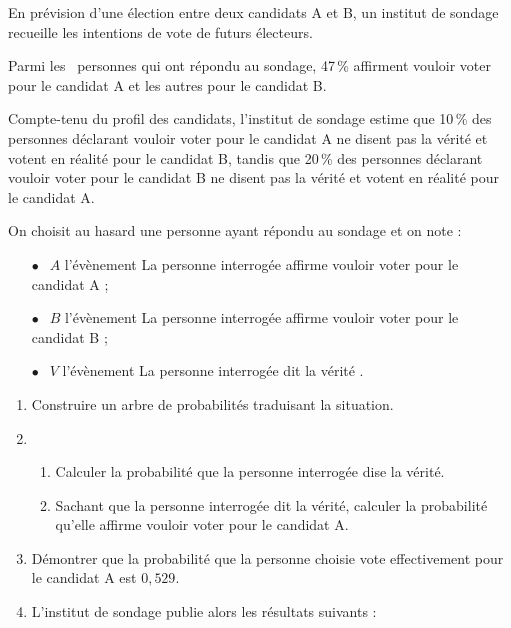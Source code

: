\documentclass[12pt,frenchb]{article}
\begin{document}
\begin{question}[subtitle={Liban 2015}]
En prévision d'une élection entre deux candidats A et B, un institut de sondage recueille les
intentions de vote de futurs électeurs.

Parmi les ~personnes qui ont répondu au sondage, 47\,\% affirment vouloir voter pour le
candidat A et les autres pour le candidat B.

\medskip

Compte-tenu du profil des candidats, l'institut de sondage estime que 10\,\% des personnes
déclarant vouloir voter pour le candidat A ne disent pas la vérité et votent en réalité pour
le candidat B, tandis que 20\,\% des personnes déclarant vouloir voter pour le candidat B ne
disent pas la vérité et votent en réalité pour le candidat A.

\medskip

On choisit au hasard une personne ayant répondu au sondage et on note :

\setlength\parindent{6mm}
\begin{itemize}
\item[$\bullet~~$] $A$ l'évènement \og La personne interrogée affirme vouloir voter pour le candidat A \fg{} ;
\item[$\bullet~~$] $B$ l'évènement \og La personne interrogée affirme vouloir voter pour le candidat B \fg{} ;
\item[$\bullet~~$] $V$ l'évènement \og La personne interrogée dit la vérité \fg.
\end{itemize}
\setlength\parindent{0mm}

\medskip

\begin{enumerate}
\item Construire un arbre de probabilités traduisant la
  situation.
\item  
	\begin{enumerate}
		\item Calculer la probabilité que la personne interrogée dise la vérité.
		\item Sachant que la personne interrogée dit la vérité, calculer la probabilité qu'elle
affirme vouloir voter pour le candidat A.
	\end{enumerate}
\item  Démontrer que la probabilité que la personne choisie vote effectivement pour le candidat
A est $0,529$.
\item  L'institut de sondage publie alors les résultats suivants :  
	

\end{enumerate}
\end{question}
\end{document}
